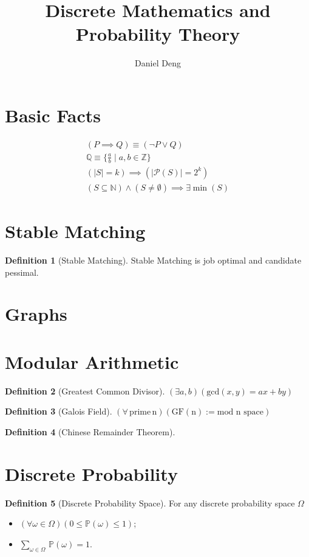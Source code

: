\documentclass[11pt]{article}
\title{Discrete Mathematics and Probability Theory}
\author{Daniel Deng}
\date{}
\theoremstyle{definition}
\newtheorem{definition}{Definition}[section]
\theoremstyle{remark}
\begin{document}
\maketitle

\section{Basic Facts}
\begin{align*}
(P\implies Q) \equiv (\neg P \vee Q) \\
\mathbb{Q}\equiv \{ \tfrac{a}{b} \mid a,b\in \mathbb{Z}\} \\
(|S|=k)\implies (|\mathcal{P}(S)|=2^k) \\
(S \subseteq \mathbb{N})\wedge (S\neq \emptyset) \implies \exists\min{(S)}
\end{align*}

\section{Stable Matching}
\begin{definition}[Stable Matching]
Stable Matching is job optimal and candidate pessimal.
\end{definition}

\section{Graphs}

\section{Modular Arithmetic}
\begin{definition}[Greatest Common Divisor]
$\left(\exists a,b\right)\left(\mathrm{gcd}(x,y)=ax+by\right)$
\end{definition}

\begin{definition}[Galois Field]
$\mathrm{\left(\forall \,\mathrm{prime} \,n\right)\left( GF(n):= \text{mod n space}\right)}$
\end{definition}

\begin{definition}[Chinese Remainder Theorem]

\end{definition}
\clearpage

\section{Discrete Probability}
\begin{definition}[Discrete Probability Space]
For any discrete probability space $\Omega$
\begin{itemize}
\item $\left(\forall \omega \in \Omega \right)\left( 0 \leq  \mathbb{P}(\omega) \leq 1\right)$;
\item $\underset{\omega \in \Omega}{\sum}\, \mathbb{P}(\omega) = 1$. 
\end{itemize}
\end{definition}
\end{document}
